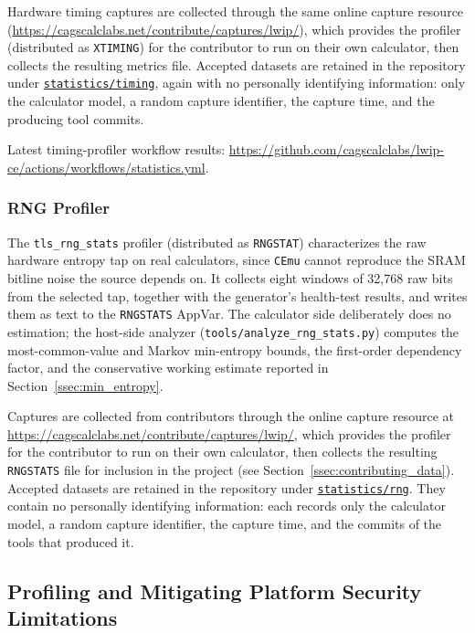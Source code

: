 \documentclass[titlepage]{report}
\begin{document}
	Hardware timing captures are collected through the same online capture resource (\url{https://cagscalclabs.net/contribute/captures/lwip/}), which provides the profiler (distributed as \texttt{XTIMING}) for the contributor to run on their own calculator, then collects the resulting metrics file. Accepted datasets are retained in the repository under \href{https://github.com/cagscalclabs/lwip-ce/tree/master/statistics/timing}{\texttt{statistics/timing}}, again with no personally identifying information: only the calculator model, a random capture identifier, the capture time, and the producing tool commits.

	Latest timing-profiler workflow results: \url{https://github.com/cagscalclabs/lwip-ce/actions/workflows/statistics.yml}.

	\subsubsection{RNG Profiler}
	The \texttt{tls\_rng\_stats} profiler (distributed as \texttt{RNGSTAT}) characterizes the raw hardware entropy tap on real calculators, since \texttt{CEmu} cannot reproduce the SRAM bitline noise the source depends on. It collects eight windows of 32{,}768 raw bits from the selected tap, together with the generator's health-test results, and writes them as text to the \texttt{RNGSTATS} AppVar. The calculator side deliberately does no estimation; the host-side analyzer (\texttt{tools/analyze\_rng\_stats.py}) computes the most-common-value and Markov min-entropy bounds, the first-order dependency factor, and the conservative working estimate reported in Section~\ref{ssec:min_entropy}.

	Captures are collected from contributors through the online capture resource at \url{https://cagscalclabs.net/contribute/captures/lwip/}, which provides the profiler for the contributor to run on their own calculator, then collects the resulting \texttt{RNGSTATS} file for inclusion in the project (see Section~\ref{ssec:contributing_data}). Accepted datasets are retained in the repository under \href{https://github.com/cagscalclabs/lwip-ce/tree/master/statistics/rng}{\texttt{statistics/rng}}. They contain no personally identifying information: each records only the calculator model, a random capture identifier, the capture time, and the commits of the tools that produced it.

	\subsection{Profiling and Mitigating Platform Security Limitations}
	
\end{document}
